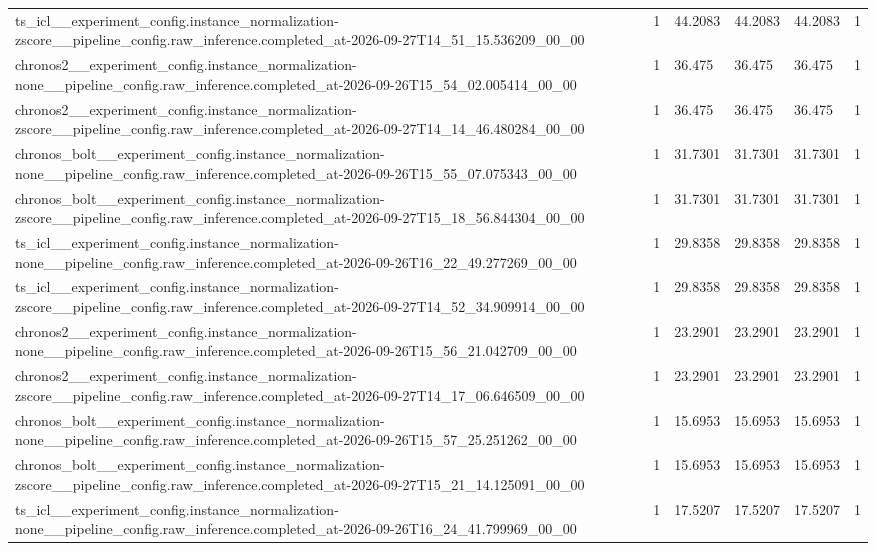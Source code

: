 \begin{tabular}{llllll}
ts\_icl\_\_experiment\_config.instance\_normalization-zscore\_\_pipeline\_config.raw\_inference.completed\_at-2026-09-27T14\_51\_15.536209\_00\_00 & 1 & 44.2083 & 44.2083 & 44.2083 & 1 \\
chronos2\_\_experiment\_config.instance\_normalization-none\_\_pipeline\_config.raw\_inference.completed\_at-2026-09-26T15\_54\_02.005414\_00\_00 & 1 & 36.475 & 36.475 & 36.475 & 1 \\
chronos2\_\_experiment\_config.instance\_normalization-zscore\_\_pipeline\_config.raw\_inference.completed\_at-2026-09-27T14\_14\_46.480284\_00\_00 & 1 & 36.475 & 36.475 & 36.475 & 1 \\
chronos\_bolt\_\_experiment\_config.instance\_normalization-none\_\_pipeline\_config.raw\_inference.completed\_at-2026-09-26T15\_55\_07.075343\_00\_00 & 1 & 31.7301 & 31.7301 & 31.7301 & 1 \\
chronos\_bolt\_\_experiment\_config.instance\_normalization-zscore\_\_pipeline\_config.raw\_inference.completed\_at-2026-09-27T15\_18\_56.844304\_00\_00 & 1 & 31.7301 & 31.7301 & 31.7301 & 1 \\
ts\_icl\_\_experiment\_config.instance\_normalization-none\_\_pipeline\_config.raw\_inference.completed\_at-2026-09-26T16\_22\_49.277269\_00\_00 & 1 & 29.8358 & 29.8358 & 29.8358 & 1 \\
ts\_icl\_\_experiment\_config.instance\_normalization-zscore\_\_pipeline\_config.raw\_inference.completed\_at-2026-09-27T14\_52\_34.909914\_00\_00 & 1 & 29.8358 & 29.8358 & 29.8358 & 1 \\
chronos2\_\_experiment\_config.instance\_normalization-none\_\_pipeline\_config.raw\_inference.completed\_at-2026-09-26T15\_56\_21.042709\_00\_00 & 1 & 23.2901 & 23.2901 & 23.2901 & 1 \\
chronos2\_\_experiment\_config.instance\_normalization-zscore\_\_pipeline\_config.raw\_inference.completed\_at-2026-09-27T14\_17\_06.646509\_00\_00 & 1 & 23.2901 & 23.2901 & 23.2901 & 1 \\
chronos\_bolt\_\_experiment\_config.instance\_normalization-none\_\_pipeline\_config.raw\_inference.completed\_at-2026-09-26T15\_57\_25.251262\_00\_00 & 1 & 15.6953 & 15.6953 & 15.6953 & 1 \\
chronos\_bolt\_\_experiment\_config.instance\_normalization-zscore\_\_pipeline\_config.raw\_inference.completed\_at-2026-09-27T15\_21\_14.125091\_00\_00 & 1 & 15.6953 & 15.6953 & 15.6953 & 1 \\
ts\_icl\_\_experiment\_config.instance\_normalization-none\_\_pipeline\_config.raw\_inference.completed\_at-2026-09-26T16\_24\_41.799969\_00\_00 & 1 & 17.5207 & 17.5207 & 17.5207 & 1 \\

\end{tabular}

